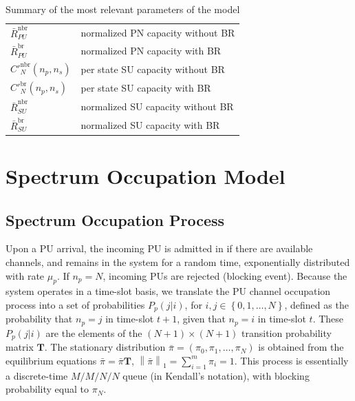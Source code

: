 \begin{table}
\begin{tabular}{ll}
$\bar{R}^{\text{nbr}}_{PU}$ & normalized PN capacity without BR\\
$\bar{R}^{\text{br}}_{PU}$ & normalized PN capacity with BR\\
$C'^{\text{nbr}}_{N}\left(n_{p},n_{s}\right)$ & per state SU capacity without BR\\
$C'^{\text{br}}_{N}\left(n_{p},n_{s}\right)$ & per state SU capacity with BR\\
$\bar{R}^{\text{nbr}}_{SU}$ & normalized SU capacity without BR\\
$\bar{R}^{\text{br}}_{SU}$ & normalized SU capacity with BR\\\hline
\end{tabular}
\centering
\caption{Summary of the most relevant parameters of the model}
\label{BR_table_parameters}
\end{table}

\section{Spectrum Occupation Model}\label{sec:Model}
\subsection{Spectrum Occupation Process}
Upon a PU arrival, the incoming PU is admitted in if there are available channels, and remains in the system for a random time, exponentially distributed with rate $\mu_{p}$. If $n_{p}=N$, incoming PUs are rejected (blocking event).
Because the system operates in a time-slot basis, we translate the PU channel occupation process into a set of probabilities $P_{p}(j|i)$, for $i,j \in \left\{0,1,\ldots,N\right\}$, defined as the probability that $n_{p}=j$ in time-slot $t+1$, given that $n_{p}=i$ in time-slot $t$. 
These $P_{p}(j|i)$ are the elements of the $\left(N+1\right)\times\left(N+1\right)$ transition probability matrix $\mathbf{T}$. The stationary distribution $\bar{\pi} = \left(\pi_{0},\pi_{1},\dots,\pi_{N}\right)$ is obtained from the equilibrium equations $\bar{\pi} = \bar{\pi}\mathbf{T}$, $\left\|\bar{\pi}\right\|_{1} = \sum_{i=1}^{m}\pi_{i}=1$.
This process is essentially a discrete-time $M/M/N/N$ queue (in Kendall's notation), with blocking probability equal to $\pi_{N}$.

